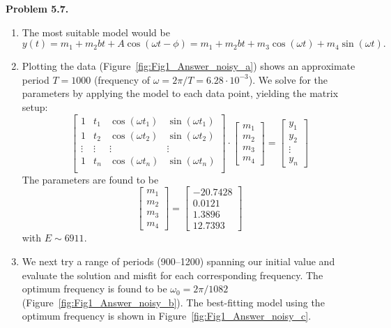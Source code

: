 \noindent
\bf{Problem 5.7.} \\
\begin{enumerate}[label=\alph*)]
\item The most suitable model would be
$$
y(t) = m_1 + m_2 bt + A\cos (\omega t - \phi) = m_1 + m_2 bt + m_3 \cos (\omega t)  + m_4\sin (\omega t).
$$
\item Plotting the data (Figure~\ref{fig:Fig1_Answer_noisy_a}) shows an approximate period $T = 1000$ (frequency of $\omega = 2 \pi/T = 6.28\cdot10^{-3}$).
We solve for the parameters by applying the model to each data point, yielding the matrix setup:
$$
\left [ \begin{array}{cccc}
1 & t_1 & \cos(\omega t_1) & \sin(\omega t_1) \\
1 & t_2 & \cos(\omega t_2) & \sin(\omega t_2) \\
\vdots & \vdots & \vdots & \vdots \\
1 & t_n & \cos(\omega t_n) & \sin(\omega t_n) \\
\end{array} \right ] \cdot \left [
\begin{array}{c}
m_1 \\
m_2 \\
m_3 \\
m_4
\end{array} \right ] = \left [
\begin{array}{c}
y_1 \\
y_2 \\
\vdots \\
y_n
\end{array} \right ]
$$
The parameters are found to be
$$
\left [
\begin{array}{c}
	m_1 \\
	m_2 \\
	m_3 \\
	m_4
\end{array} \right ]
=  \left [
\begin{array}{r}
-20.7428 \\
 0.0121 \\
 1.3896 \\
12.7393
\end{array} \right ]
$$
with $E \sim 6911$.
\item We next try a range of periods (900--1200) spanning our initial value 
and evaluate the solution and misfit
for each corresponding frequency.  The optimum frequency is found to be $\omega_0 = 2 \pi / 1082$ (Figure~\ref{fig:Fig1_Answer_noisy_b}). 
The best-fitting model using the optimum frequency is shown in Figure~\ref{fig:Fig1_Answer_noisy_c}.

\end{enumerate}

